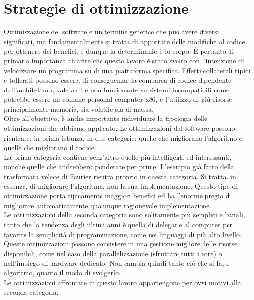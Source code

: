 \section{Strategie di ottimizzazione}
Ottimizzazione del software è un termine generico che può avere diversi 
significati, ma fondamentalmente si tratta di apportare delle modifiche al 
codice per ottenere dei benefici, e dunque la determinante è lo scopo. \`E 
pertanto di 
primaria importanza chiarire che 
questo lavoro è stato svolto con l'intenzione di velocizzare un programma su 
di una piattaforma specifica. Effetti collaterali tipici e tollerati possono 
essere, di conseguenza, la comparsa di codice dipendente dall'architettura, 
vale a dire non funzionante su sistemi incompatibili come potrebbe essere un 
comune 
personal computer x86, e l'utilizzo di più risorse - principalmente memoria, 
sia volatile sia di massa. \\
Oltre all'obiettivo, è anche importante individuare la tipologia delle 
ottimizzazioni 
che abbiamo applicato. Le ottimizzazioni del software possono 
rientrare, in prima istanza, in due 
categorie: quelle che migliorano l'algoritmo e quelle che migliorano il codice. 
\\La prima categoria contiene senz'altro quelle più intelligenti ed 
interessanti, nonché quelle che andrebbero ponderate per prime. L'esempio già 
fatto della trasformata veloce di Fourier rientra proprio in questa categoria. 
Si tratta, in essenza, di migliorare l'algoritmo, non la sua implementazione.
Questo tipo di ottimizzazione porta tipicamente maggiori benefici ed ha 
l'enorme pregio di migliorare automaticamente qualunque ragionevole 
implementazione.\\
Le ottimizzazioni della seconda categoria sono solitamente più semplici e 
banali, tanto che la tendenza degli ultimi anni è quella di delegarle al 
computer per favorire la semplicità di programmazione, come nei linguaggi di 
più alto livello. Queste ottimizzazioni possono consistere in una gestione 
migliore delle risorse disponibili, come nel caso della parallelizzazione 
(sfruttare tutti i core) o nell'impiego di hardware dedicato.
Non cambia quindi tanto ciò che si fa, o algoritmo, quanto il modo di 
svolgerlo.\\
Le ottimizzazioni affrontate in questo lavoro appartengono per ovvi motivi alla 
seconda categoria.

